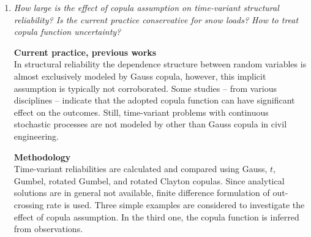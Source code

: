 \begin{enumerate}[leftmargin=*, align=left]
  
  \item \textit{How large is the effect of copula assumption on time-variant structural reliability? Is the current practice conservative for snow loads? How to treat copula function uncertainty?}

    \textbf{Current practice, previous works} \\
    In structural reliability the dependence structure between random variables is almost exclusively modeled by Gauss copula, however, this implicit assumption is typically not corroborated. Some studies -- from various disciplines -- indicate that the adopted copula function can have significant effect on the outcomes. Still, time-variant problems with continuous stochastic processes are not modeled by other than Gauss copula in civil engineering.

    \textbf{Methodology} \\%
    Time-variant reliabilities are calculated and compared using Gauss, $t$, Gumbel, rotated Gumbel, and rotated Clayton copulas.
    Since analytical solutions are in general not available, finite difference formulation of out-crossing rate is used. Three simple examples are considered to investigate the effect of copula assumption. In the third one, the copula function is inferred from observations.


\end{enumerate}

